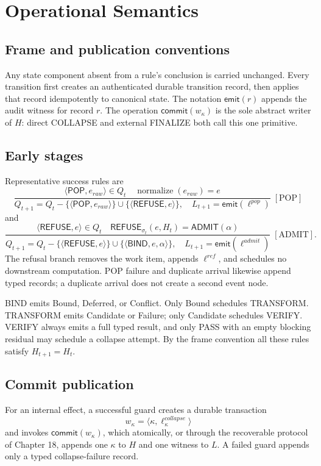 \documentclass[11pt,openany]{book}
\newcommand{\Pop}{\mathsf{POP}}
\newcommand{\Refuse}{\mathsf{REFUSE}}
\newcommand{\Bind}{\mathsf{BIND}}
\begin{document}
\chapter{Operational Semantics}
\section{Frame and publication conventions}
Any state component absent from a rule's conclusion is carried unchanged.
Every transition first creates an authenticated durable transition record,
then applies that record idempotently to canonical state. The notation
\(\mathsf{emit}(r)\) appends the audit witness for record \(r\). The operation
\(\mathsf{commit}(w_\kappa)\) is the sole abstract writer of \(H\): direct
COLLAPSE and external FINALIZE both call this one primitive.

\section{Early stages}
Representative success rules are
\[
\frac{\langle\Pop,e_{raw}\rangle\in Q_t\quad
      \operatorname{normalize}(e_{raw})=e}
     {Q_{t+1}=Q_t-\{\langle\Pop,e_{raw}\rangle\}
        \cup\{\langle\Refuse,e\rangle\},\quad
      L_{t+1}=\mathsf{emit}(\ell^{pop})}
 \;[\mathrm{POP}]
\]
and
\[
\frac{\langle\Refuse,e\rangle\in Q_t\quad
      \Refuse_{\sigma_t}(e,H_t)=\mathsf{ADMIT}(\alpha)}
     {Q_{t+1}=Q_t-\{\langle\Refuse,e\rangle\}
        \cup\{\langle\Bind,e,\alpha\rangle\},\quad
      L_{t+1}=\mathsf{emit}(\ell^{admit})}
 \;[\mathrm{ADMIT}].
\]
The refusal branch removes the work item, appends \(\ell^{ref}\), and schedules
no downstream computation. POP failure and duplicate arrival likewise append
typed records; a duplicate arrival does not create a second event node.

BIND emits Bound, Deferred, or Conflict. Only Bound schedules TRANSFORM.
TRANSFORM emits Candidate or Failure; only Candidate schedules VERIFY. VERIFY
always emits a full typed result, and only PASS with an empty blocking residual
may schedule a collapse attempt. By the frame convention all these rules
satisfy \(H_{t+1}=H_t\).

\section{Commit publication}
For an internal effect, a successful guard creates a durable transaction
\[
 w_\kappa=\langle\kappa,\ell_\kappa^{collapse}\rangle
\]
and invokes \(\mathsf{commit}(w_\kappa)\), which atomically, or through the
recoverable protocol of Chapter 18, appends one \(\kappa\) to \(H\) and one
witness to \(L\). A failed guard appends only a typed collapse-failure record.
\end{document}
